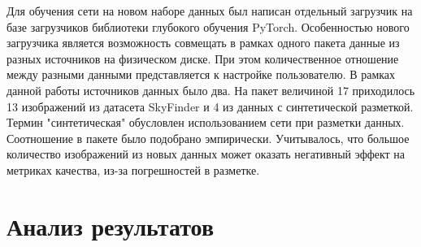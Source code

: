 Для обучения сети на новом наборе данных был написан отдельный загрузчик на базе загрузчиков библиотеки глубокого обучения PyTorch.
Особенностью нового загрузчика является возможность совмещать в рамках одного пакета данные из разных источников на физическом диске.
При этом количественное отношение между разными данными представляется к настройке пользователю.
В рамках данной работы источников данных было два.
На пакет величиной 17 приходилось 13 изображений из датасета SkyFinder и 4 из данных с синтетической разметкой.
Термин "синтетическая" обусловлен использованием сети при разметки данных.
Соотношение в пакете было подобрано эмпирически.
Учитывалось, что большое количество изображений из новых данных может оказать негативный эффект на метриках качества,
из-за погрешностей в разметке.

\section{Анализ результатов}

\Conc

\printbibliography[%
    heading=bibintoc%
]


